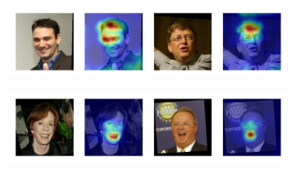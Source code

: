 \begin{figure}
\captionsetup[subfigure]{labelformat=empty}
    \centering
    \begin{subfigure}
        \centering
        \includegraphics[width=0.75\linewidth, trim={0 1cm 0 0},clip]{saliency-new/saliency-smooth/bald-1.jpeg}
        \footnotesize
        \vspace{0.4cm}
    \end{subfigure}
    
    \begin{subfigure}
        \centering
        \includegraphics[width=0.75\linewidth, trim={0 1cm 0 0},clip]{saliency-new/saliency-smooth/smile-1.jpeg}
        \footnotesize
        \vspace{0.4cm}
    \end{subfigure}
    

\end{figure}

